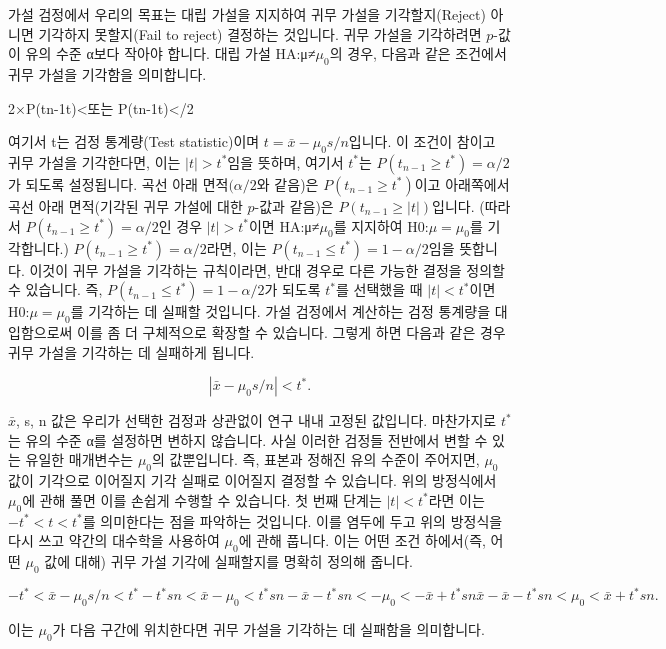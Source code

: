 \documentclass[
]{scrbook}
\begin{document}
가설 검정에서 우리의 목표는 대립 가설을 지지하여 귀무 가설을
기각할지(Reject) 아니면 기각하지 못할지(Fail to reject) 결정하는
것입니다. 귀무 가설을 기각하려면 \(p\)-값이 유의 수준 α보다 작아야
합니다. 대립 가설 HA:μ≠\(\mu_0\)의 경우, 다음과 같은 조건에서 귀무
가설을 기각함을 의미합니다.

2×P(tn-1\ge \textbar t\textbar)\textless{}\alpha 또는
P(tn-1\ge \textbar t\textbar)\textless{}\alpha/2

여기서 t는 검정 통계량(Test statistic)이며 \(t=\bar{x}-\mu_0s/n\)입니다.
이 조건이 참이고 귀무 가설을 기각한다면, 이는 \(|t|>t^*\)임을 뜻하며,
여기서 \(t^*\)는 \(P(t_{n-1} \ge t^*) = \alpha/2\)가 되도록 설정됩니다.
곡선 아래 면적\((\alpha/2\)와 같음)은 \(P(t_{n-1} \ge t^*)\)이고
아래쪽에서 곡선 아래 면적(기각된 귀무 가설에 대한 \(p\)-값과 같음)은
\(P(t_{n-1} \ge |t|)\)입니다. (따라서
\(P(t_{n-1} \ge t^*) = \alpha/2\)인 경우 \(|t|>t^*\)이면
HA:μ≠\(\mu_0\)를 지지하여 H0:\(\mu=\mu_0\)를 기각합니다.)
\(P(t_{n-1} \ge t^*) = \alpha/2\)라면, 이는
\(P(t_{n-1} \le t^*) = 1-\alpha/2\)임을 뜻합니다. 이것이 귀무 가설을
기각하는 규칙이라면, 반대 경우로 다른 가능한 결정을 정의할 수 있습니다.
즉, \(P(t_{n-1} \le t^*) = 1-\alpha/2\)가 되도록 \(t^*\)를 선택했을 때
\(|t|<t^*\)이면 H0:\(\mu=\mu_0\)를 기각하는 데 실패할 것입니다. 가설
검정에서 계산하는 검정 통계량을 대입함으로써 이를 좀 더 구체적으로
확장할 수 있습니다. 그렇게 하면 다음과 같은 경우 귀무 가설을 기각하는 데
실패하게 됩니다.

\[
|\bar{x}-\mu_0s/n|<t^*.
\]

\(\bar{x}\), s, n 값은 우리가 선택한 검정과 상관없이 연구 내내 고정된
값입니다. 마찬가지로 \(t^*\)는 유의 수준 α를 설정하면 변하지 않습니다.
사실 이러한 검정들 전반에서 변할 수 있는 유일한 매개변수는 \(\mu_0\)의
값뿐입니다. 즉, 표본과 정해진 유의 수준이 주어지면, \(\mu_0\) 값이
기각으로 이어질지 기각 실패로 이어질지 결정할 수 있습니다. 위의
방정식에서 \(\mu_0\)에 관해 풀면 이를 손쉽게 수행할 수 있습니다. 첫 번째
단계는 \(|t|<t^*\)라면 이는 \(-t^*<t<t^*\)를 의미한다는 점을 파악하는
것입니다. 이를 염두에 두고 위의 방정식을 다시 쓰고 약간의 대수학을
사용하여 \(\mu_0\)에 관해 풉니다. 이는 어떤 조건 하에서(즉, 어떤
\(\mu_0\) 값에 대해) 귀무 가설 기각에 실패할지를 명확히 정의해 줍니다.

\[
-t^*<\bar{x}-\mu_0s/n<t^*-t^*sn<\bar{x}-\mu_0<t^*sn-\bar{x}-t^*sn<-\mu_0<-\bar{x}+t^*sn\bar{x}-\bar{x}-t^*sn<\mu_0<\bar{x}+t^*sn.
\]

이는 \(\mu_0\)가 다음 구간에 위치한다면 귀무 가설을 기각하는 데 실패함을
의미합니다.
\end{document}

